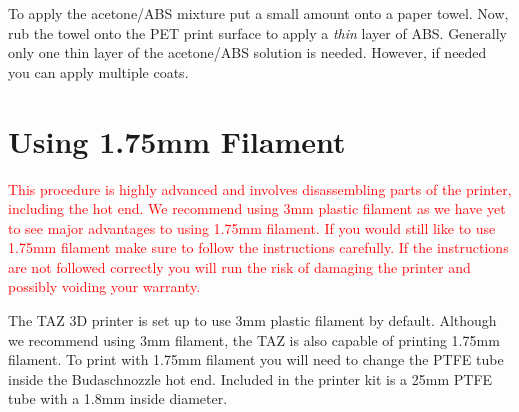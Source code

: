 To apply the acetone/ABS mixture put a small amount onto a paper towel. Now, rub the towel onto the PET print surface to apply a \emph{thin} layer of ABS. Generally only one thin layer of the acetone/ABS solution is needed. However, if needed you can apply multiple coats.

\section{Using 1.75mm Filament}
\textcolor{red}{This procedure is highly advanced and involves disassembling parts of the printer, including the hot end. We recommend using 3mm plastic filament as we have yet to see major advantages to using 1.75mm filament. If you would still like to use 1.75mm filament make sure to follow the instructions carefully. If the instructions are not followed correctly you will run the risk of damaging the printer and possibly voiding your warranty.}

The TAZ 3D printer is set up to use 3mm plastic filament by default. Although we recommend using 3mm filament, the TAZ is also capable of printing 1.75mm filament. To print with 1.75mm filament you will need to change the PTFE tube inside the Budaschnozzle hot end. Included in the printer kit is a 25mm PTFE tube with a 1.8mm inside diameter.

